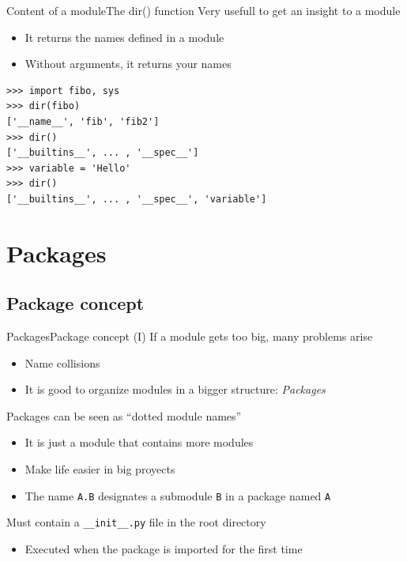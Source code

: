 \documentclass[10pt,compress]{beamer} %
\begin{document}
\begin{frame}[fragile]{Content of a module}{The dir() function}
	Very usefull to get an insight to a module
	\begin{itemize}
		\item It returns the names defined in a module
		\item Without arguments, it returns your names
	\end{itemize}
	\begin{block}{}
	\begin{verbatim}
>>> import fibo, sys
>>> dir(fibo)
['__name__', 'fib', 'fib2']
>>> dir()
['__builtins__', ... , '__spec__']
>>> variable = 'Hello'
>>> dir()
['__builtins__', ... , '__spec__', 'variable']
\end{verbatim}
	\vspace{-0.2cm}
	\end{block}
\end{frame}

\section{Packages}
\subsection{Package concept}
\begin{frame}{Packages}{Package concept (I)}
		If a module gets too big, many problems arise
			\begin{itemize}
			\item Name collisions
			\item It is good to organize modules in a bigger structure: \textit{Packages}
			\end{itemize}
		Packages can be seen as ``dotted module names''
			\begin{itemize}
			\item It is just a module that contains more modules
			\item Make life easier in big proyects
			\item The name \texttt{A.B} designates a submodule \texttt{B} in a package named \texttt{A}
			\end{itemize}
		Must contain a \texttt{\_\_init\_\_.py} file in the root directory
			\begin{itemize}
			\item Executed when the package is imported for the first time
			\end{itemize}
\end{frame}
\end{document}
